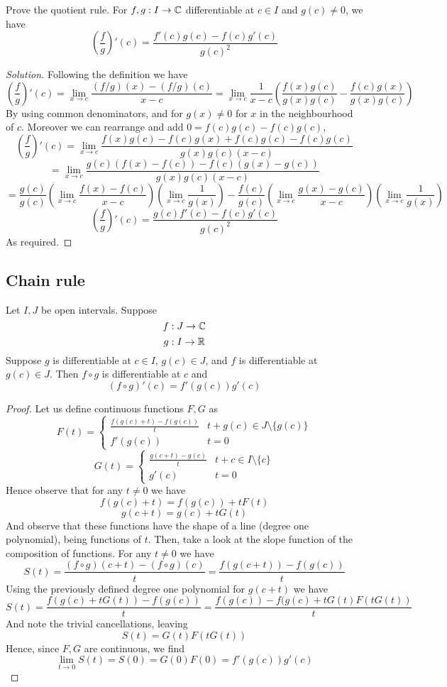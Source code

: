 \begin{exercise}
  Prove the quotient rule. For $f,g:I\to\mathbb C$ differentiable at $c\in I$ and $g(c)\neq 0$,
  we have 
  \[(\frac{f}{g})'(c) = \frac{f'(c)g(c) - f(c)g'(c)}{g(c)^2}\]
\end{exercise}
\begin{proof}[Solution]
  Following the definition we have 
  \[(\frac{f}{g})'(c)=\lim_{x\to c} \frac{(f/g)(x) - (f/g)(c)}{x-c} =
  \lim_{x\to c}\frac{1}{x-c}(\frac{f(x)g(c)}{g(x)g(c)} - \frac{f(c)g(x)}{g(x)g(c)})\]
  By using common denominators, and for $g(x)\neq 0$ for $x$ in the neighbourhood of $c$.
  Moreover we can rearrange and add $0=f(c)g(c)-f(c)g(c)$,
  \[(\frac{f}{g})'(c)= \lim_{x\to c}\frac{f(x)g(c)-f(c)g(x)+f(c)g(c)-f(c)g(c)}{g(x)g(c)(x-c)}\]
  \[=\lim_{x\to c} \frac{g(c)(f(x)-f(c)) - f(c)(g(x)-g(c))}{g(x)g(c)(x-c)}\]
  \[=\frac{g(c)}{g(c)}(\lim_{x\to c}\frac{f(x)-f(c)}{x-c})(\lim_{x\to
    c}\frac{1}{g(x)}) - \frac{f(c)}{g(c)}(\lim_{x\to
  c}\frac{g(x)-g(c)}{x-c})(\lim_{x\to c}\frac{1}{g(x)}) \]
  \[(\frac{f}{g})'(c)=\frac{g(c)f'(c) - f(c)g'(c)}{g(c)^2}\]
  As required.
\end{proof}

\subsection{Chain rule}
\begin{theorem}
  Let $I,J$ be open intervals. Suppose 
  \[f: J\to \mathbb C\]
  \[g: I\to \mathbb R\]
  Suppose $g$ is differentiable at $c\in I$, $g(c)\in J$, and $f$ is differentiable at
  $g(c)\in J$. Then $f\circ g$ is differentiable at $c$ and 
  \[(f\circ g)'(c) = f'(g(c))g'(c)\]
  \label{thm:chainRule}
\end{theorem}
\begin{proof}
  Let us define continuous functions $F,G$ as 
  \[F(t)=
    \begin{cases}
      \frac{f(g(c)+t)-f(g(c))}{t} & t+g(c)\in J\setminus\{g(c)\} \\
      f'(g(c)) & t=0 
    \end{cases}
  \]
  \[G(t)=
    \begin{cases}
      \frac{g(c+t)-g(c)}{t} & t+c\in I\setminus\{c\} \\
      g'(c) & t=0 
    \end{cases}
  \]
  Hence observe that for any $t\neq 0$ we have 
  \[f(g(c)+t) = f(g(c))+tF(t)\]
  \[g(c+t) = g(c)+tG(t)\]
  And observe that these functions have the shape of a line (degree one polynomial), being
  functions of $t$. Then, take a look at the slope function of the composition of
  functions. For any $t\neq 0$ we have
  \[S(t)= \frac{(f\circ g)(c+t)-(f\circ g)(c)}{t} = \frac{f(g(c+t))-f(g(c))}{t}\]
  Using the previously defined degree one polynomial for $g(c+t)$ we have
  \[S(t)= \frac{f(g(c)+tG(t))-f(g(c))}{t}=\frac{f(g(c))-f(g(c)+tG(t)F(tG(t))}{t}\]
  And note the trivial cancellations, leaving
  \[S(t)=G(t)F(tG(t))\]
  Hence, since $F,G$ are continuous, we find 
  \[\lim_{t\to 0}S(t)=S(0)=G(0)F(0)=f'(g(c))g'(c)\]
\end{proof}

